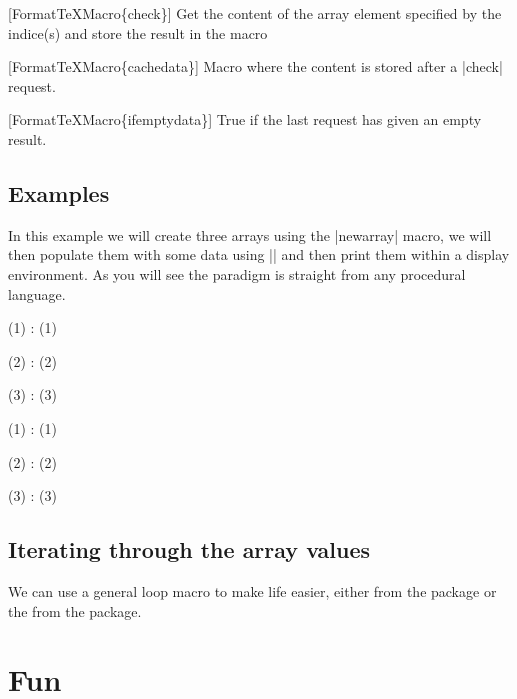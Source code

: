   [\BS FormatTeXMacro\{check\}] Get the content of the array element specified
  by the indice(s) and store the result in the macro 

  [\BS FormatTeXMacro\{cachedata\}] Macro where the content is stored after
  a |check| request.

  [\BS FormatTeXMacro\{ifemptydata\}] True if the last  request
  has given an empty result.




\section{Examples}

In this example we will create three arrays using the |newarray| macro, we will
then populate them with some data using |\readarray| and then print them within a display environment.
As you will see the paradigm is straight from any procedural language.

\newarray\Actors
\newarray\Dates
\newarray\Sexes
{}

\begin{teX}
\newarray\Actors
\newarray\Dates
\newarray\Sexes
{}


  \item[\Actors(1)] : \Dates(1)
  \item[\Actors(2)] : \Dates(2)
  \item[\Actors(3)] : \Dates(3)

\end{teX}

\begin{teX}
\item[\Actors(1)] : \Dates(1)
\item[\Actors(2)] : \Dates(2)
\item[\Actors(3)] : \Dates(3)
\end{teX}


\section*{Iterating through the array values}
We can use a general loop macro to make life easier, either  from the package  or the   from the  package.


\def\NumberActors{3}
\begin{teX}

   \multido{\iActor=1+1}{\NumberActors}{%
   \item[\Actors(\iActor)] : \Dates(\iActor)}

\end{teX}









\chapter{Fun}

